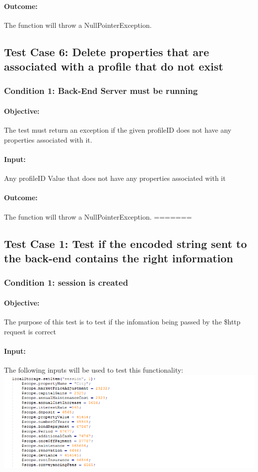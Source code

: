 \documentclass[a4paper,12pt]{article}
\begin{document}
\paragraph{Outcome: } The function will throw a NullPointerException.

\subsection{Test Case 6: Delete properties that are associated with a profile that do not exist}
\subsubsection{Condition 1: Back-End Server must be running}
\paragraph{Objective:}The test must return an exception if the given profileID does not have any properties associated with it.
\paragraph{Input:} Any profileID Value that does not have any properties associated with it
\paragraph{Outcome: } The function will throw a NullPointerException.
=======
\subsection{Test Case 1: Test if the encoded string sent to the back-end contains the right information}
\subsubsection{Condition 1: session is created}
\paragraph{Objective:}The purpose of this test is to test if the infomation being passed by the \$http request is correct 
\paragraph{Input:}The following inputs will be used to test this functionality:\\
\includegraphics[width=1\textwidth]{./Images/input.png}
\end{document}
